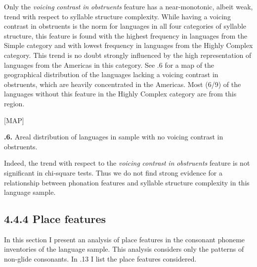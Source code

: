   Only the \textit{voicing} \textit{contrast} \textit{in} \textit{obstruents} feature has a near-monotonic, albeit weak, trend with respect to syllable structure complexity. While having a voicing contrast in obstruents is the norm for languages in all four categories of syllable structure, this feature is found with the highest frequency in languages from the Simple category and with lowest frequency in languages from the Highly Complex category. This trend is no doubt strongly influenced by the high representation of languages from the Americas in this category. See .6 for a map of the geographical distribution of the languages lacking a voicing contrast in obstruents, which are heavily concentrated in the Americas. Most (6/9) of the languages without this feature in the Highly Complex category are from this region.



[MAP]



\textbf{.6.} Areal distribution of languages in sample with no voicing contrast in obstruents.



  Indeed, the trend with respect to the \textit{voicing} \textit{contrast} \textit{in} \textit{obstruents} feature is not significant in chi-square tests. Thus we do not find strong evidence for a relationship between phonation features and syllable structure complexity in this language sample.


\subsection{4.4.4 Place features}

  In this section I present an analysis of place features in the consonant phoneme inventories of the language sample. This analysis considers only the patterns of non-glide consonants. In .13 I list the place features considered.






